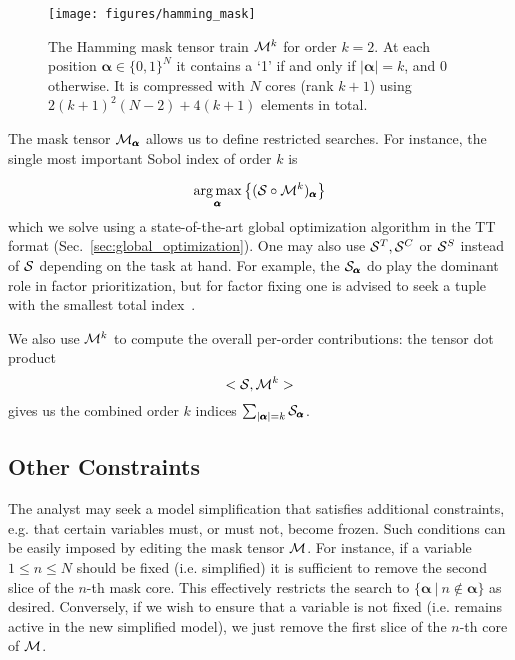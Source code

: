 \documentclass[review, twocolumn]{svjour3}          %
\newcommand\given[1][]{\:#1\vert\:}
\DeclareMathOperator*{\argmax}{arg\,max}
\begin{document}
\begin{figure}[t]\center
	\texttt{[image: figures/hamming\_mask]}
	\caption{The Hamming mask tensor train $\mathcal{M}^k$ for order $k=2$. At each position $\pmb{\alpha} \in \{0, 1\}^N$ it contains a `1' if and only if $|\pmb{\alpha}| = k$, and 0 otherwise. It is compressed with $N$ cores (rank $k+1$) using $2 (k+1)^2 (N-2) + 4(k+1)$ elements in total.}
	\label{fig:hamming_mask}
\end{figure}

The mask tensor $\mathcal{M}_{\pmb{\alpha}}$ allows us to define restricted searches. For instance, the single most important Sobol index of order $k$ is

\begin{equation}
\argmax_{\pmb{\alpha}} \left\{ (\set{S} \circ \set{M}^k)_{\pmb{\alpha}} \right\}
\end{equation}
%
which we solve using a state-of-the-art global optimization algorithm in the TT format (Sec.~\ref{sec:global_optimization}). One may also use $\mathcal{S}^T, \mathcal{S}^C$ or $\mathcal{S}^S$ instead of $\mathcal{S}$ depending on the task at hand. For example, the $\mathcal{S}_{\pmb{\alpha}}$ do play the dominant role in factor prioritization, but for factor fixing one is advised to seek a tuple with the smallest total index~\cite{SRACCGST:08}. 

We also use $\mathcal{M}^k$ to compute the overall per-order contributions: the tensor dot product
%
\begin{equation} \label{eq:mask_dot}
<\mathcal{S}, \mathcal{M}^k>
\end{equation}
%
gives us the combined order $k$ indices $\sum_{|\pmb{\alpha}| = k} \mathcal{S}_{\pmb{\alpha}}$.

\subsection{Other Constraints}

The analyst may seek a model simplification that satisfies additional constraints, e.g. that certain variables must, or must not, become frozen. Such conditions can be easily imposed by editing the mask tensor $\mathcal{M}$. For instance, if a variable $1 \le n \le N$ should be fixed (i.e. simplified) it is sufficient to remove the second slice of the $n$-th mask core. This 
effectively restricts the search to $\{\pmb{\alpha} \given n \notin \pmb{\alpha}\}$ as desired. Conversely, if we wish to ensure that a variable is not fixed (i.e. remains active in the new simplified model), we just remove the first slice of the $n$-th core of $\mathcal{M}$.
\end{document}
